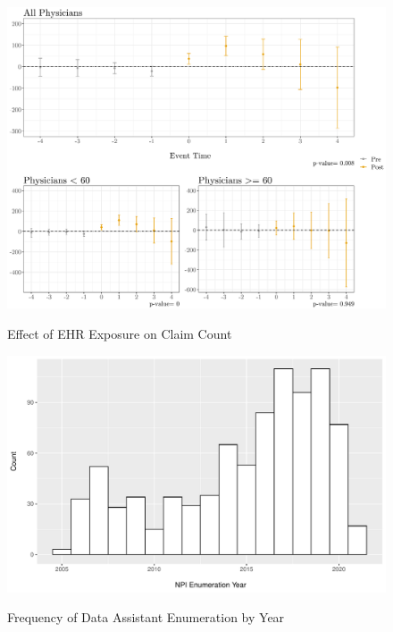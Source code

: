 \documentclass[11pt]{article}
\begin{document}
\begin{figure}[p]
    \centering
    \caption{Effect of EHR Exposure on Claim Count}
    \includegraphics[scale=.57]{Objects/claim_plot.pdf}
    \label{fig:claim}
\end{figure}

\begin{figure}[p]
\centering
\caption{Frequency of Data Assistant Enumeration by Year}
\includegraphics[scale=.5]{Objects/dataassistant_histogram.pdf}
\label{fig:dataassistant_histogram}
\end{figure}

\clearpage

\renewcommand*{\bibfont}{\footnotesize}

\printbibliography

\clearpage
\end{document}
